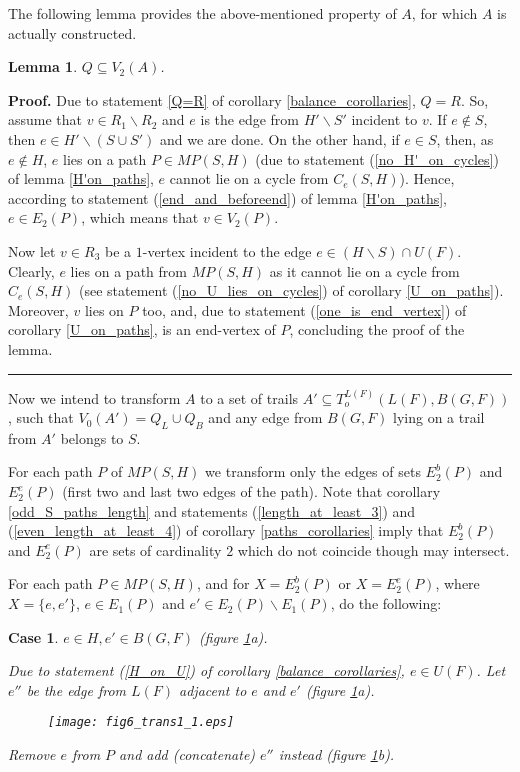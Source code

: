 \documentclass[a4paper, 12pt]{article}
\newtheorem{lemma}{Lemma}[subsection]
\newtheorem{case}{Case}
\newenvironment{proof}[1][Proof]{\noindent\textbf{#1.} }{\ \rule{0.5em}{0.5em}}
\begin{document}
The following lemma provides the above-mentioned property of $A$,
for which $A$ is actually constructed.
\begin{lemma} \label{R_on_paths}
$Q \subseteq V_2(A)$.
\end{lemma}
\begin{proof}
Due to statement \ref{Q=R} of corollary \ref{balance_corollaries},
$Q = R$. So, assume that $v \in R_1 \backslash R_2$ and $e$ is the
edge from $H' \backslash S'$ incident to $v$. If $e \notin S$, then
$e \in H' \backslash (S \cup S')$ and we are done. On the other
hand, if $e \in S$, then, as $e \notin H$, $e$ lies on a path $P \in
MP(S,H)$ (due to statement (\ref{no_H'_on_cycles}) of lemma
\ref{H'on_paths}, $e$ cannot lie on a cycle from $C_e(S,H)$). Hence,
according to statement (\ref{end_and_beforeend}) of lemma
\ref{H'on_paths}, $e \in E_2(P)$, which means that $v \in V_2(P)$.

Now let $v \in R_3$ be a $1$-vertex incident to the edge $e \in (H
\backslash S) \cap U(F)$. Clearly, $e$ lies on a path from $MP(S,H)$
as it cannot lie on a cycle from $C_e(S,H)$ (see statement
(\ref{no_U_lies_on_cycles}) of corollary \ref{U_on_paths}).
Moreover, $v$ lies on $P$ too, and, due to statement
(\ref{one_is_end_vertex}) of corollary \ref{U_on_paths}, is an
end-vertex of $P$, concluding the proof of the lemma.
\end{proof}

\bigskip

Now we intend to transform $A$ to a set of trails $A' \subseteq
T_o^{L(F)}(L(F), B(G,F))$, such that $V_0(A')=Q_L \cup Q_B$ and any
edge from $B(G,F)$ lying on a trail from $A'$ belongs to $S$.

For each path $P$ of $MP(S,H)$ we transform only the edges of sets
$E_2^b(P)$ and $E_2^e(P)$ (first two and last two edges of the
path). Note that corollary \ref{odd_S_paths_length} and statements
(\ref{length_at_least_3}) and (\ref{even_length_at_least_4}) of
corollary \ref{paths_corollaries} imply that $E_2^b(P)$ and
$E_2^e(P)$ are sets of cardinality $2$ which do not coincide though
may intersect.

For each path $P \in MP(S,H)$, and for $X=E_2^b(P)$ or $X=E_2^e(P)$,
where $X=\{ e, e' \}$, $e \in E_1(P)$ and $e' \in E_2(P) \backslash
E_1(P)$, do the following:

\begin{case} \label{case_einH_e'inB}
$e \in H, e' \in B(G,F)$ (figure \ref{fig_trans1_1}a).

Due to statement (\ref{H_on_U}) of corollary
\ref{balance_corollaries}, $e \in U(F)$. Let $e''$ be the edge from
$L(F)$ adjacent to $e$ and $e'$ (figure \ref{fig_trans1_1}a).

\begin{figure}[h]
\begin{center}
\texttt{[image: fig6\_trans1\_1.eps]}\\
\caption{}\label{fig_trans1_1}
\end{center}
\end{figure}

Remove $e$ from $P$ and add (concatenate) $e''$ instead (figure
\ref{fig_trans1_1}b).
\end{case}
\end{document}
